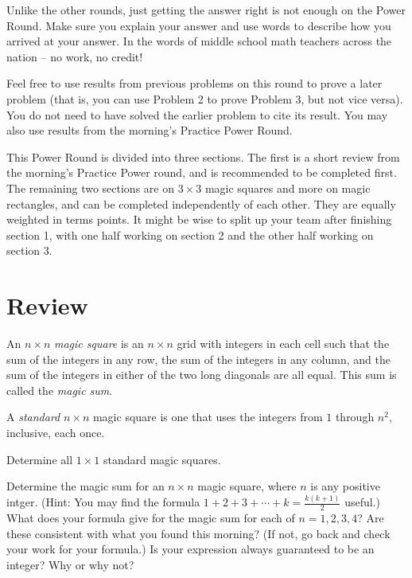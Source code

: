 \documentclass[11pt]{article}
\renewenvironment{problem}{\begin{problems}}{\end{problems}\vspace{5pt}}
\begin{document}
\setlength{\parindent}{0pt}

Unlike the other rounds, just getting the answer right is not enough on the Power Round. 
Make sure you explain your answer and use words to describe how you arrived at your answer. 
In the words of middle school math teachers across the nation -- no work, no credit! \newline

Feel free to use results from previous problems on this round to prove a later problem 
(that is, you can use Problem 2 to prove Problem 3, but not vice versa). 
You do not need to have solved the earlier problem to cite its result.
You may also use results from the morning's Practice Power Round. \newline

This Power Round is divided into three sections. The first is a short review from the morning's 
Practice Power round, and is recommended to be completed first. 
The remaining two sections are on $3 \times 3$ magic squares and more on magic rectangles, 
and can be completed independently of each other.  They are equally weighted in terms points.
It might be wise to split up your team after finishing section 1, with one half working on section 2 and the other half working on section 3.

\section{Review}

\begin{definition}
An $n \times n$ \textit{magic square} is an $n \times n$ grid with integers in each cell such that
the sum of the integers in any row, the sum of the integers in any column, and the sum of the integers
in either of the two long diagonals are all equal. This sum is called the \textit{magic sum}.
\end{definition}

\begin{definition}
A \textit{standard} $n \times n$ magic square is one that uses the integers from $1$ through $n^2$, inclusive, each once.
\end{definition}

\begin{problem}[1 point]
Determine all $1 \times 1$ standard magic squares.
\end{problem}

\begin{problem}[5 points]
Determine the magic sum for an $n \times n$ magic square, where $n$ is any positive intger.
(Hint: You may find the formula $1 + 2 + 3 + \cdots + k = \frac{k(k+1)}{2}$ useful.)
What does your formula give for the magic sum for each of $n = 1, 2, 3, 4$?
Are these consistent with what you found this morning?
(If not, go back and check your work for your formula.)
Is your expression always guaranteed to be an integer? Why or why not?
\end{problem}
\end{document}

